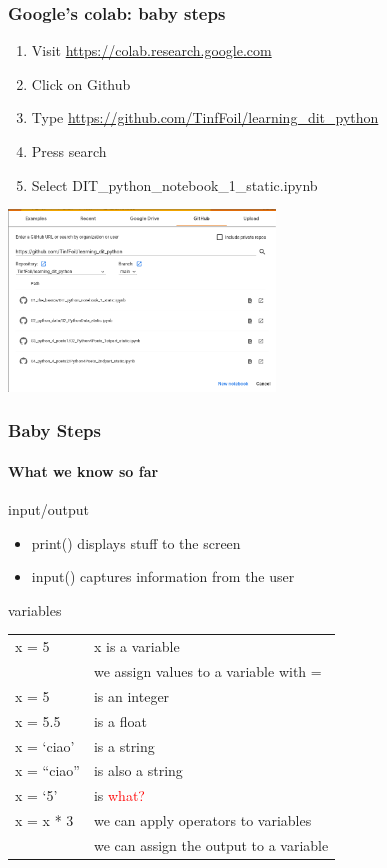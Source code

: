\documentclass{beamer}
\newcommand{\red}[1]{\textcolor{red}{#1}}
\begin{document}
\begin{frame}
\frametitle{Google’s colab: baby steps}

\begin{enumerate}
\item Visit \url{https://colab.research.google.com}
\item Click on Github
\item Type \url{https://github.com/TinfFoil/learning_dit_python}
\item Press search
\item Select 
\alert{DIT\_python\_notebook\_1\_static.ipynb}
\end{enumerate}

\begin{center}
 \includegraphics[width=71mm]{img/colab_git_import.png}
\end{center}
\end{frame}

\begin{frame}
\frametitle{Baby Steps}
\framesubtitle{What we know so far}

\alert{input/output}

\begin{itemize}
\item print() displays stuff to the screen
\item input() captures information from the user
\end{itemize}										\pause 

\alert{variables}
\medskip

\centering
\begin{tabular}{ll}\hline
x = 5		& x is a variable	\\
			& we assign values to a variable with = 	\\\hline	\pause 

x = 5		& is an integer	\\
x = 5.5		& is a float	\\
x = ‘ciao’	& is a string	\\
x = “ciao”	& is also a string	\\
x = ‘5’		& is \red{what?}	\\				\hline	\pause 
 
x  = x * 3	& we can apply operators to variables	\\
			& we can assign the output to a variable	\\	\hline

\end{tabular}
\end{frame}
\end{document}
